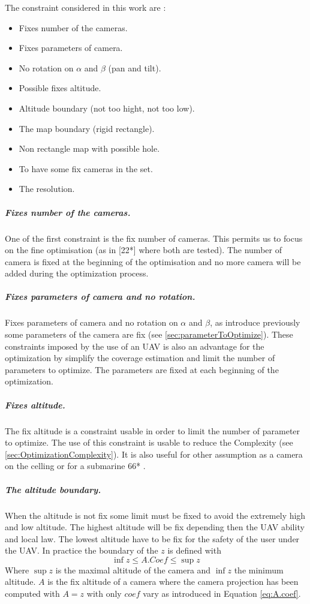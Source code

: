 The constraint considered in this work are : 
\begin{itemize}
	\item Fixes number of the cameras.
	\item Fixes parameters of camera.
	\item No rotation  on  $\alpha$ and $\beta$ (pan and tilt).
	\item Possible fixes altitude.
	\item Altitude boundary (not too hight, not too low).  	
	\item The map boundary (rigid rectangle).  
	\item Non rectangle map with possible hole.
	\item To have some fix cameras in the set. 

	\item The resolution.\\

\end{itemize} 
\subparagraph{Fixes number of the cameras.}
One of the first constraint is the fix number of cameras. This permits us to focus on the fine optimisation (as in  [22*] where both are tested). The number of camera is fixed at the beginning of the optimisation and no more camera will be added during the optimization process.  \\

\subparagraph{Fixes parameters of camera and no rotation.}
Fixes parameters of camera and no rotation  on  $\alpha$ and $\beta$, as introduce previously some parameters of the camera are fix (see \ref{sec:parameterToOptimize}). These constraints imposed by the use of an UAV is also an advantage for the optimization by simplify the coverage estimation and limit the number of parameters to optimize. The parameters are fixed at each beginning of the optimization.\\

\subparagraph{Fixes altitude.}
 The fix altitude is a constraint usable in order to limit the number of parameter to optimize. The use of this constraint is usable to reduce the Complexity (see \ref{sec:OptimizationComplexity}).  It is also useful for other assumption as a camera on the celling or for a submarine 66* \cite{66*}.\\

\subparagraph{The altitude boundary.}
 When the altitude is not fix  some limit must be fixed to avoid the extremely high and low altitude. The highest altitude will be fix depending then the UAV ability and local law. The lowest altitude have to be fix for the safety of the user under the UAV.  
In practice the boundary of the $z$ is defined  with 
 \begin{equation}\label{eq:boundaryZ}
   \inf z\leq A.Coef\leq \sup z  
 \end{equation} 
 Where $\sup z$ is the maximal altitude of the camera and $\inf z$ the minimum altitude. $A$ is the fix altitude  of a camera where the camera projection has been computed with $A=z$ with only $coef$  vary as introduced in Equation \ref{eq:A.coef}. \\ 
 
